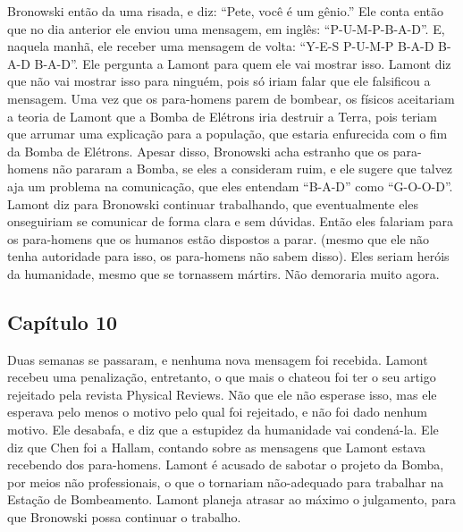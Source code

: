 \documentclass[14pt,portuguese]{extreport}
\begin{document}
	  Bronowski então da uma risada, e diz: “Pete, você é um gênio.” Ele conta então que no dia 
	  anterior ele enviou uma mensagem, em inglês: “P-U-M-P-B-A-D”. E, naquela manhã, ele receber 
	  uma mensagem de volta: “Y-E-S P-U-M-P B-A-D B-A-D B-A-D”. Ele pergunta a Lamont para quem 
	  ele vai mostrar isso. Lamont diz que não vai mostrar isso para ninguém, pois só iriam falar 
	  que ele falsificou a mensagem. Uma vez que os para-homens parem de bombear, os físicos 
	  aceitariam a teoria de Lamont que a Bomba de Elétrons iria destruir a Terra, pois teriam 
	  que arrumar uma explicação para a população, que estaria enfurecida com o fim da Bomba 
	  de Elétrons. Apesar disso, Bronowski acha estranho que os para-homens não pararam a Bomba, 
	  se eles a consideram ruim, e ele sugere que talvez aja um problema na comunicação, que 
	  eles entendam “B-A-D” como “G-O-O-D”. Lamont diz para Bronowski continuar trabalhando, 
	  que eventualmente eles onseguiriam se comunicar de forma clara e sem dúvidas. Então eles 
	  falariam para os para-homens que os humanos estão dispostos a parar. (mesmo que ele não 
	  tenha autoridade para isso, os para-homens não sabem disso). Eles seriam heróis da 
	  humanidade, mesmo que se tornassem mártirs. Não demoraria muito agora.

	\subsection{Capítulo 10}

	  Duas semanas se passaram, e nenhuma nova mensagem foi recebida. Lamont recebeu uma 
	  penalização, entretanto, o que mais o chateou foi ter o seu artigo rejeitado pela 
	  revista Physical Reviews. Não que ele não esperase isso, mas ele esperava pelo menos 
	  o motivo pelo qual foi rejeitado, e não foi dado nenhum motivo. Ele desabafa, e diz que 
	  a estupidez da humanidade vai condená-la. Ele diz que Chen foi a Hallam, contando sobre 
	  as mensagens que Lamont estava recebendo dos para-homens. Lamont é acusado de sabotar o 
	  projeto da Bomba, por meios não professionais, o que o tornariam não-adequado para trabalhar 
	  na Estação de Bombeamento. Lamont planeja atrasar ao máximo o julgamento, para que Bronowski 
	  possa continuar o trabalho.
	
\end{document}
